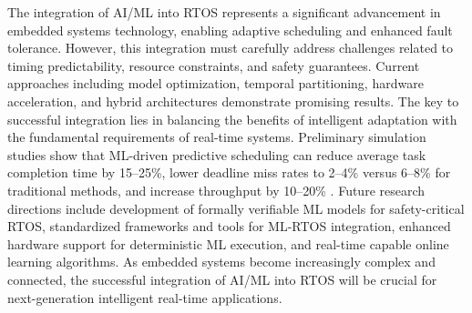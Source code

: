 \documentclass[11pt,a4paper]{article}
\begin{document}
The integration of AI/ML into RTOS represents a significant advancement in embedded systems technology, enabling adaptive scheduling and enhanced fault tolerance. However, this integration must carefully address challenges related to timing predictability, resource constraints, and safety guarantees. Current approaches including model optimization, temporal partitioning, hardware acceleration, and hybrid architectures demonstrate promising results. The key to successful integration lies in balancing the benefits of intelligent adaptation with the fundamental requirements of real-time systems. Preliminary simulation studies show that ML-driven predictive scheduling can reduce average task completion time by 15--25\%, lower deadline miss rates to 2--4\% versus 6--8\% for traditional methods, and increase throughput by 10--20\% \cite{gracias2025leveraging}. Future research directions include development of formally verifiable ML models for safety-critical RTOS, standardized frameworks and tools for ML-RTOS integration, enhanced hardware support for deterministic ML execution, and real-time capable online learning algorithms. As embedded systems become increasingly complex and connected, the successful integration of AI/ML into RTOS will be crucial for next-generation intelligent real-time applications.
\end{document}
